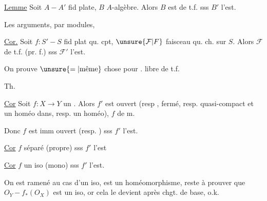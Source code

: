\uline{Lemme} Soit $A\mathrel{-}A'$ fid plate, $B$ $A$-algèbre. Alors $B$ est de t.f.  sss $B'$ l'est.

Les  arguments, par modules, 

\uline{Cor.} Soit $f:S'\mathrel{-}S$ fid plat qu. cpt, $\unsure{\mathcal F|F}$ faisceau qu. ch. sur $S$. Alors $\mathcal F$ de t.f. (pr. f.) sss $\mathcal F'$ l'est.

On prouve $\unsure{=|\text{même}}$ chose pour . libre de t.f. 



Th.

\uline{Cor}  Soit $f:X\longrightarrow Y$ un . Alors   $f'$ est ouvert (resp , fermé, resp. quasi-compact et un homéo dans, resp. un homéo), $f$ de m.

Donc $f$ est imm ouvert (resp. \unsure{--}) sss $f'$ l'est.

\uline{Cor} $f$ séparé (propre) sss $f'$ l'est




\uline{Cor} $f$ un iso (mono) sss $f'$ l'est.

On est ramené au cas d'un iso,    est un homéomorphisme, reste à prouver que $O_Y\mathrel{-}f_*(O_X)$ est un iso, or cela le devient après chgt. de base, o.k.

